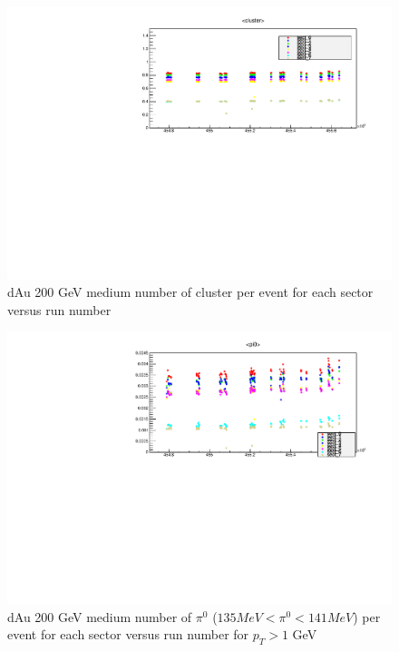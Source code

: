 \documentclass{article}
\begin{document}
\begin{figure}
    \centering
    \includegraphics[width=1\textwidth]{fig_pi0vn/meancluster_withtiming.pdf}
    \caption{dAu 200 GeV  medium number of cluster per event for each sector versus run number}
    \label{clusterpersector_withtiming}
\end{figure}
\begin{figure}
    \centering
    \includegraphics[width=1\textwidth]{fig_pi0vn/meanpi0_notiming.pdf}
    \caption{dAu 200 GeV  medium number of $\pi^{0}$ ($135 MeV <\pi^0 < 141 MeV$) per event for each sector versus run number for $p_{T}>1$ GeV}
    \label{meanpi0_notiming}
\end{figure}
\end{document}
